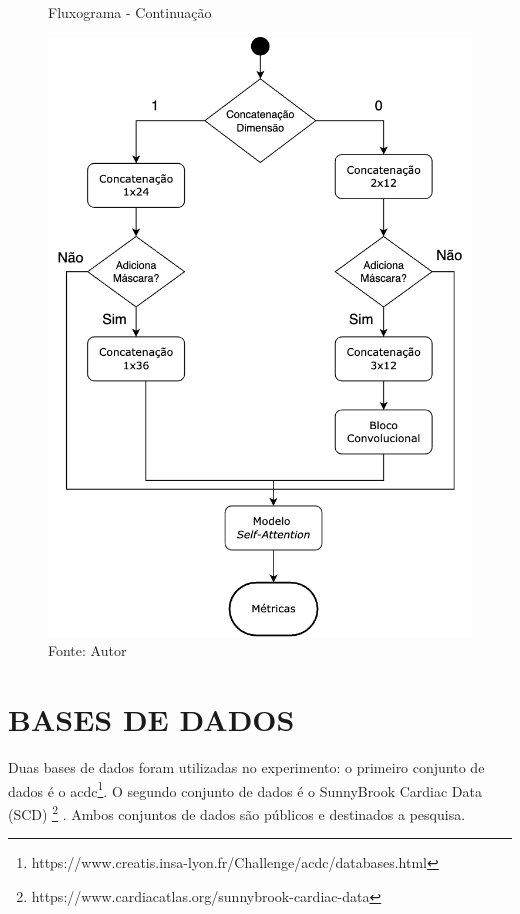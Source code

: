 \begin{figure}[H]
    \centering
    \captionsetup{width=0.98\textwidth, justification=justified}
    \caption{Fluxograma - Continuação}
    \includegraphics[scale=0.36]{figures/fig015-02.png}
    \caption*{Fonte: Autor}
    \label{fig:fig015-02}
\end{figure}

\section{BASES DE DADOS} 
\label{subsec:cap4_dataset}

Duas bases de dados foram utilizadas no experimento: o primeiro conjunto de dados é o \gls{acdc}\footnote{https://www.creatis.insa-lyon.fr/Challenge/acdc/databases.html}. O segundo conjunto de dados é o SunnyBrook Cardiac Data (SCD) \footnote{https://www.cardiacatlas.org/sunnybrook-cardiac-data} \cite{radauEvaluationFrameworkAlgorithms2009}. Ambos conjuntos de dados são públicos e destinados a pesquisa.

